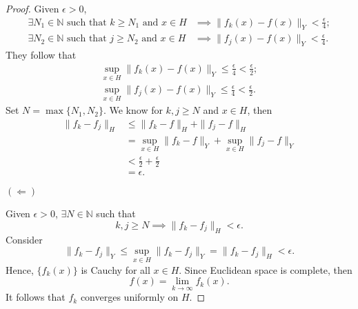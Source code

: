 \begin{Exercise}
\begin{enumerate}[a)]
\begin{proof}
Given $\epsilon>0$, 
\begin{align*}
\exists N_1\in\mathbb{N} \text{ such that } k\geq N_1 \text{ and } x\in H &\implies \| f_k(x)-f(x) \|_Y<\frac{\epsilon}{4}; \\
\exists N_2\in\mathbb{N} \text{ such that } j\geq N_2 \text{ and } x\in H &\implies \| f_j(x)-f(x) \|_Y<\frac{\epsilon}{4}.
\end{align*}
They follow that
\begin{align*}
\sup_{x\in H} \| f_k(x) - f(x) \|_Y \leq \frac{\epsilon}{4} < \frac{\epsilon}{2}; \\
\sup_{x\in H} \| f_j(x) - f(x) \|_Y \leq \frac{\epsilon}{4} < \frac{\epsilon}{2}.
\end{align*}
Set $N = \max\{N_1, N_2\}$. We know for $k,j\geq N$ and $x\in H$, then
\begin{align*}
\| f_k - f_j \|_H
&\leq \|f_k - f \|_H + \|f_j - f \|_H \\
&= \sup_{x\in H} \| f_k-f \|_Y + \sup_{x\in H} \| f_j-f \|_Y \\
&< \frac{\epsilon}{2} + \frac{\epsilon}{2} \\
&= \epsilon.
\end{align*}

\vspace{2ex}

$(\Longleftarrow)$

Given $\epsilon>0$, $\exists N\in\mathbb{N}$ such that
$$
k,j \geq N \implies \|f_k - f_j \|_H < \epsilon.
$$
Consider
$$
\| f_k-f_j \|_Y \leq \sup_{x\in H} \| f_k-f_j \|_Y = \| f_k-f_j \|_H < \epsilon.
$$
Hence, $\{f_k(x)\}$ is Cauchy for all $x\in H$. Since Euclidean space is complete, then
$$
f(x) = \lim_{k\to\infty} f_k(x).
$$
It follows that $f_k$ converges uniformly on $H$.
\end{proof}
\end{enumerate}
\end{Exercise}